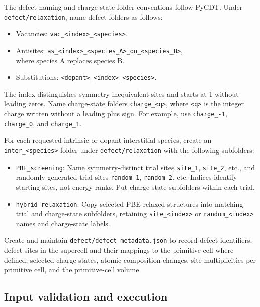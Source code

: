 \documentclass[aip,jap,reprint,amsmath,amssymb]{revtex4-2}
\begin{document}
The defect naming and charge-state folder conventions follow PyCDT.\cite{Broberg2018} Under \texttt{defect/\allowbreak relaxation}, name defect folders as follows:
\begin{itemize}
    \item Vacancies: \texttt{vac\_\allowbreak <index>\_\allowbreak <species>}.
    \item Antisites: \texttt{as\_\allowbreak <index>\_\allowbreak <species\_\allowbreak A>\_\allowbreak on\_\allowbreak <species\_\allowbreak B>},\\
    where species A replaces species B.
    \item Substitutions: \texttt{<dopant>\_\allowbreak <index>\_\allowbreak <species>}.
\end{itemize}
The index distinguishes symmetry-inequivalent sites and starts at 1 without leading zeros. Name charge-state folders \texttt{charge\_<q>}, where \texttt{<q>} is the integer charge written without a leading plus sign. For example, use \texttt{charge\_-1}, \texttt{charge\_0}, and \texttt{charge\_1}.

For each requested intrinsic or dopant interstitial species, create an \texttt{inter\_<species>} folder under \texttt{defect/\allowbreak relaxation} with the following subfolders:
\begin{itemize}
    \item \texttt{PBE\_screening}: Name symmetry-distinct trial sites \texttt{site\_1}, \texttt{site\_2}, etc., and randomly generated trial sites \texttt{random\_1}, \texttt{random\_2}, etc. Indices identify starting sites, not energy ranks. Put charge-state subfolders within each trial.
    \item \texttt{hybrid\_relaxation}: Copy selected PBE-relaxed structures into matching trial and charge-state subfolders, retaining \texttt{site\_<index>} or \texttt{random\_<index>} names and charge-state labels.
\end{itemize}

Create and maintain \texttt{defect/\allowbreak defect\_metadata.json} to record defect identifiers, defect sites in the supercell and their mappings to the primitive cell where defined, selected charge states, atomic composition changes, site multiplicities per primitive cell, and the primitive-cell volume.

\subsection{Input validation and execution}
\end{document}
